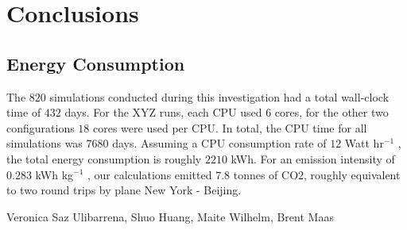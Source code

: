 \documentclass[aa]{aa}
\begin{document}

\section{Conclusions}

\subsection{Energy Consumption}
The $820$ simulations conducted during this investigation had a total wall-clock time of $432$ days. For the XYZ runs, each CPU used $6$ cores, for the other two configurations $18$ cores were used per CPU. In total, the CPU time for all simulations was $7680$ days. Assuming a CPU consumption rate of $12$ Watt hr$^{-1}$ \citep{PortegiesZwart2020}, the total energy consumption is roughly $2210$ kWh. For an emission intensity of $0.283$ kWh kg$^{−1}$ \citep{Wittman}, our calculations emitted $7.8$ tonnes of CO2, roughly equivalent to two round trips by plane New York - Beijing.

\begin{acknowledgements}
Veronica  Saz  Ulibarrena,  Shuo  Huang,  Maite  Wilhelm,  Brent Maas
\end{acknowledgements}

\end{document}
